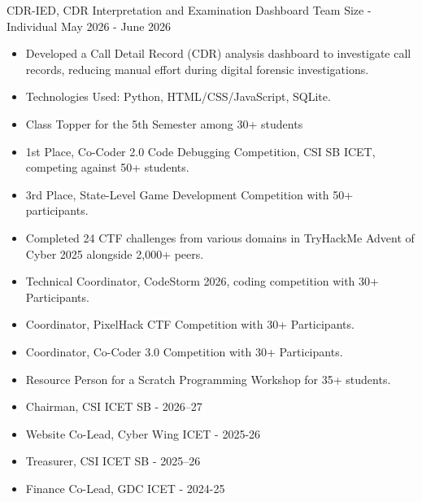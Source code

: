 \documentclass[10pt,a4paper]{altacv}
\begin{document}
\divider

\cvevent
    {CDR-IED, CDR Interpretation and Examination Dashboard}
    {Team Size - Individual}
    {May 2026 - June 2026}
    {}
    \begin{itemize}
        \item Developed a Call Detail Record (CDR) analysis dashboard to investigate call records, reducing manual effort during digital forensic investigations.
        \item Technologies Used: Python, HTML/CSS/JavaScript, SQLite.
    \end{itemize}


\begin{itemize}
    \item Class Topper for the 5th Semester among 30+ students
    \item 1st Place, Co-Coder 2.0 Code Debugging Competition, CSI SB ICET, competing against 50+ students.
    \item 3rd Place, State-Level Game Development Competition with 50+ participants.
    \item Completed 24 CTF challenges from various domains in TryHackMe Advent of Cyber 2025 alongside 2,000+ peers.
    \item Technical Coordinator, CodeStorm 2026, coding competition with 30+ Participants.
    \item Coordinator, PixelHack CTF Competition with 30+ Participants.
    \item Coordinator, Co-Coder 3.0 Competition with 30+ Participants.
    \item Resource Person for a Scratch Programming Workshop for 35+ students.
    
    
\end{itemize}


\begin{itemize}
    \item Chairman, CSI ICET SB - 2026–27
    \item Website Co-Lead, Cyber Wing ICET - 2025-26
    \item Treasurer, CSI ICET SB - 2025–26
    \item Finance Co-Lead, GDC ICET - 2024-25

\end{itemize}

    
\end{document}
